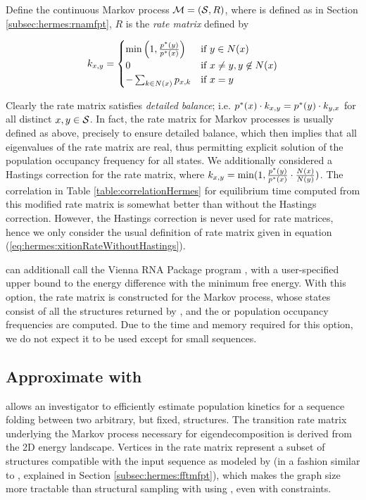 Define the continuous Markov process
$\mathcal{M}=(\mathcal S,R)$, where \str is defined as in Section
\ref{subsec:hermes:rnamfpt}, $R$ is the {\em rate matrix} defined by

\begin{align}
\label{eq:hermes:xitionRateWithoutHastings}
k_{x,y}=
\begin{cases}
\min\left(1, \frac{\pSt(y)}{\pSt(x)}\right)
& \text{if $y \in N(x)$} \\
0 &\text{if $x \ne y, y \not\in N(x)$} \\
- \sum_{k \in N(x)} p_{x,k} & \text{if $x=y$} \\
\end{cases}
\end{align}

Clearly the rate matrix satisfies {\em detailed balance}; i.e. $p^*(x)
\cdot k_{x,y} = p^*(y) \cdot k_{y,x}$ for all distinct $x,y \in
\mathcal S$. In fact, the rate matrix for Markov processes is usually
defined as above, precisely to ensure detailed balance, which then
implies that all eigenvalues of the rate matrix are real, thus
permitting explicit solution of the population occupancy frequency for
all states. We additionally considered a Hastings correction
for the rate matrix, where $k_{x,y} = \min(1, \frac{p^*(y)}{p^*(x)}
\cdot \frac{N(x)}{N(y)})$. The correlation in
Table \ref{table:correlationHermes} for equilibrium time computed from this
modified rate matrix is somewhat better than without the Hastings
correction. However, the Hastings correction is never used for rate
matrices, hence we only consider the usual definition of rate matrix
given in equation (\ref{eq:hermes:xitionRateWithoutHastings}).

\rnaeq can additionall call the
Vienna RNA Package program \rnasub \citep{Wuchty.b99}, with a
user-specified upper bound to the energy difference with the minimum
free energy. With this option, the rate matrix is
constructed for the Markov process, whose states consist of all
the structures returned by \rnasub, and the \eqt or
population occupancy frequencies are computed. Due to the time
and memory required for this option, we do not expect it to be used except for
small sequences.

\subsection{Approximate \eqt with \ffteq}
\label{subsec:hermes:ffteq}

\ffteq allows an investigator to efficiently estimate population
kinetics for a sequence folding between two arbitrary, but fixed,
structures. The transition rate matrix underlying the Markov process
necessary for eigendecomposition is derived from the 2D energy
landscape. Vertices in the rate matrix represent a subset of
structures compatible with the input sequence as modeled by
\ffttwo (in a fashion similar to \fftmfpt, explained in Section
\ref{subsec:hermes:fftmfpt}), which makes the graph size more tractable
than structural
sampling with \rnasub using \rnaeq, even with constraints.

